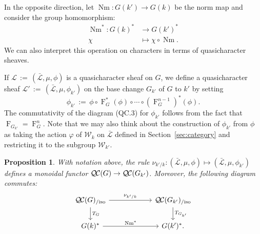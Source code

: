\documentclass{amsart}
\theoremstyle{plain}
\newtheorem{proposition}[theorem]{Proposition}
\theoremstyle{definition}
\theoremstyle{remark}
\newcommand{\Weil}[1]{\mathcal{W}_{#1}}
\newcommand{\Frob}[1]{\operatorname{F}_{#1}}
\DeclareMathOperator{\Nm}{Nm}
\newcommand{\ceq}{{\, :=\, }}
\newcommand{\qcs}[1]{{\mathcal{#1}}}
\newcommand{\gqcs}[1]{{\mathcal{\bar #1}}}
\newcommand{\QC}{{\mathcal{Q\hskip-0.8pt C}}}
\newcommand{\QCiso}[1]{\QC(#1)_{/\text{iso}}}
\newcommand{\TrFrob}[1]{T_{#1}}
\begin{document}
In the opposite direction, let $\Nm : G(k') \to G(k)$ be the norm map and consider the group homomorphism:
\begin{align*}
\Nm^* : G(k)^* &\to G(k')^* \\
\chi &\mapsto \chi\circ \Nm.
\end{align*}
We can also interpret this operation on characters in terms of quasicharacter sheaves.

If $\qcs{L} \ceq (\gqcs{L}, \mu, \phi)$ is a quasicharacter sheaf on $G$, we define
a quasicharacter sheaf $\qcs{L}' \ceq (\gqcs{L}, \mu, \phi_{k'})$ on the base change
$G_{k'}$ of $G$ to $k'$ by setting
\[
\phi_{k'} \ceq \phi \circ \Frob{G}^*(\phi) \circ \cdots \circ (\Frob{G}^{n-1})^*(\phi).
\]
The commutativity of the diagram (QC.3) for $\phi_{k'}$
follows from the fact that $\Frob{G_{k'}} = \Frob{G}^n$.
Note that we may also think about the construction of $\phi_{k'}$ from $\phi$
as taking the action $\varphi$ of $\Weil{k}$ on $\gqcs{L}$
defined in Section~\ref{sec:category} and restricting it to the subgroup $\Weil{k'}$.

\begin{proposition}\label{prop:basechange}
With notation above,
the rule $\nu_{k'/k}: (\gqcs{L}, \mu, \phi) \mapsto (\gqcs{L}, \mu, \phi_{k'})$
 defines a monoidal functor $\QC(G) \to \QC(G_{k'})$.
 Moreover, the following diagram commutes:
\[
\begin{tikzcd}[column sep=60]
\QCiso{G} \rar{\nu_{k'/k}} \dar{\TrFrob{G}} & \QCiso{G_{k'}} \dar{\TrFrob{G_{k'}}} \\
G(k)^*  \rar{\Nm^*} & G(k')^*.
\end{tikzcd}
\]
\end{proposition}
\end{document}
